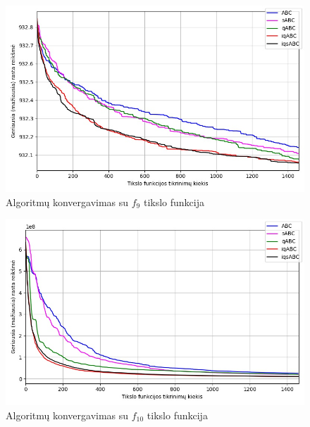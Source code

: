 \documentclass{VUMIFKompMagistrinis}
\begin{document}
\begin{landscape}
\begin{multicols}{2}
\begin{figure}[H]
    \centering
    \includegraphics[scale=0.45]{img/2kv/all_f9.jpg}
    \caption{Algoritmų konvergavimas su $f_{9}$ tikslo funkcija}
    \label{img:konf9}
\end{figure}



\begin{figure}[H]
    \centering
    \includegraphics[scale=0.45]{img/2kv/all_f10.jpg}
    \caption{Algoritmų konvergavimas su $f_{10}$ tikslo funkcija}
    \label{img:konf10}
\end{figure}



\end{multicols}\newpage
\begin{multicols}{2}


\end{multicols}
\end{landscape}
\end{document}
